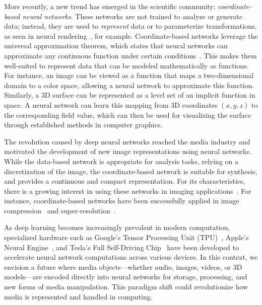 More recently, a new trend has emerged in the scientific community: \textit{coordinate-based neural networks}. These networks are not trained to analyze or generate data; instead, they are used to \textit{represent} data or to parameterize transformations, as seen in neural rendering~\citep{starNeuralRendering22}, for example. Coordinate-based networks leverage the universal approximation theorem, which states that neural networks can approximate any continuous function under certain conditions~\citep{HORNIK1989359,cybenko89}. This makes them well-suited to represent data that can be modeled mathematically as functions. For instance, an image can be viewed as a function that maps a two-dimensional domain to a color space, allowing a neural network to approximate this function. Similarly, a 3D surface can be represented as a level set of an implicit function in space. A neural network can learn this mapping from 3D coordinates \((x, y, z)\) to the corresponding field value, which can then be used for visualizing the surface through established methods in computer graphics.

The revolution caused by deep neural networks reached the media industry and motivated the development of new image representations using neural networks. While the data-based network is appropriate for analysis tasks, relying on a discretization of the image, the coordinate-based network is suitable for synthesis, and provides a continuous and compact representation. For its characteristics, there is a growing interest in using these networks in imaging applications~\citep{xie2022neural}. For instance, coordinate-based networks have been successfully applied in image compression~\citep{dupont2021coin} and super-resolution~\citep{czerkawski2021neural}.

As deep learning becomes increasingly prevalent in modern computation, specialized hardware such as Google's Tensor Processing Unit (TPU)~\citep{googleTPU}, Apple's Neural Engine~\citep{appleNeural}, and Tesla's Full Self-Driving Chip~\citep{Talpes2020Tesla} have been developed to accelerate neural network computations across various devices. In this context, we envision a future where media objects—whether audio, images, videos, or 3D models—are encoded directly into neural networks for storage, processing, and new forms of media manipulation. This paradigm shift could revolutionize how media is represented and handled in computing.


